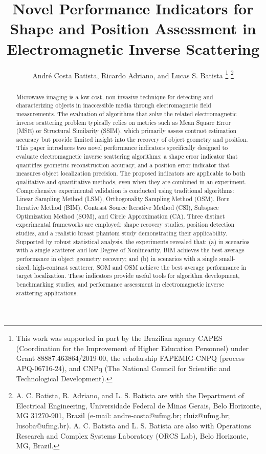 \documentclass{IEEEtran}
\begin{document}
    \title{Novel Performance Indicators for Shape and Position Assessment in Electromagnetic Inverse Scattering}
    \author{Andr\'e Costa Batista, Ricardo Adriano, and Lucas S. Batista
    \thanks{This work was supported in part by the Brazilian agency CAPES (Coordination for the Improvement of Higher Education Personnel) under Grant 88887.463864/2019-00, the scholarship FAPEMIG-CNPQ (process APQ-06716-24), and CNPq (The National Council for Scientific and Technological Development).}
    \thanks{A. C. Batista, R. Adriano, and L. S. Batista are with the Department of Electrical Engineering, Universidade Federal de Minas Gerais, Belo Horizonte, MG 31270-901, Brazil (e-mail: andre-costa@ufmg.br; rluiz@ufmg.br; lusoba@ufmg.br). A. C. Batista and L. S. Batista are also with Operations Research and Complex Systems Laboratory (ORCS Lab), Belo Horizonte, MG, Brazil.}}
   
    \maketitle
    
    \begin{abstract}
        Microwave imaging is a low-cost, non-invasive technique for detecting and characterizing objects in inaccessible media through electromagnetic field measurements. The evaluation of algorithms that solve the related electromagnetic inverse scattering problem typically relies on metrics such as Mean Square Error (MSE) or Structural Similarity (SSIM), which primarily assess contrast estimation accuracy but provide limited insight into the recovery of object geometry and position. This paper introduces two novel performance indicators specifically designed to evaluate electromagnetic inverse scattering algorithms: a shape error indicator that quantifies geometric reconstruction accuracy, and a position error indicator that measures object localization precision. The proposed indicators are applicable to both qualitative and quantitative methods, even when they are combined in an experiment. Comprehensive experimental validation is conducted using traditional algorithms: Linear Sampling Method (LSM), Orthogonality Sampling Method (OSM), Born Iterative Method (BIM), Contrast Source Iterative Method (CSI), Subspace Optimization Method (SOM), and Circle Approximation (CA). Three distinct experimental frameworks are employed: shape recovery studies, position detection studies, and a realistic breast phantom study demonstrating their applicability. Supported by robust statistical analysis, the experiments revealed that: (a) in scenarios with a single scatterer and low Degree of Nonlinearity, BIM achieves the best average performance in object geometry recovery; and (b) in scenarios with a single small-sized, high-contrast scatterer, SOM and OSM achieve the best average performance in target localization. These indicators provide useful tools for algorithm development, benchmarking studies, and performance assessment in electromagnetic inverse scattering applications.
    \end{abstract}
    
\end{document}
